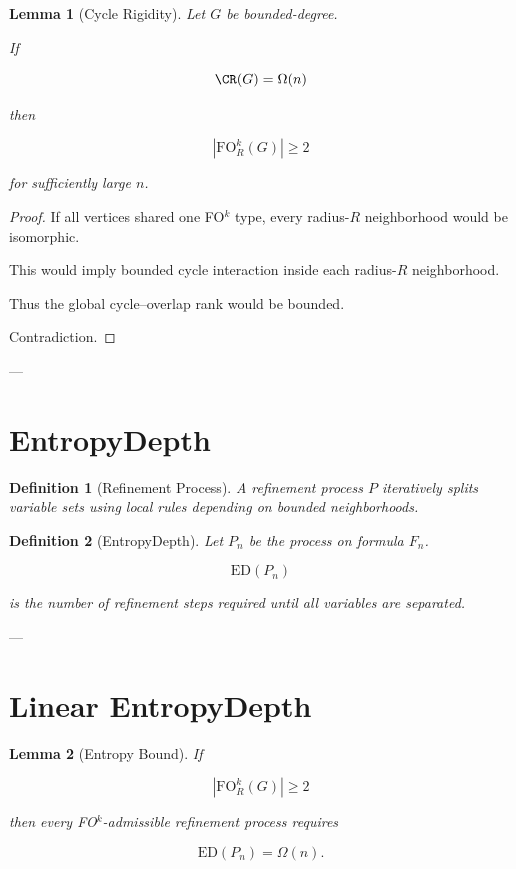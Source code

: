 \documentclass[11pt]{article}
\newtheorem{definition}{Definition}
\newtheorem{lemma}{Lemma}
\begin{document}
\begin{lemma}[Cycle Rigidity]
Let $G$ be bounded-degree.

If

\[
\CR(G) = \Omega(n)
\]

then

\[
|\mathrm{FO}^k_R(G)| \ge 2
\]

for sufficiently large $n$.
\end{lemma}

\begin{proof}
If all vertices shared one FO$^k$ type, every radius-$R$
neighborhood would be isomorphic.

This would imply bounded cycle interaction inside each
radius-$R$ neighborhood.

Thus the global cycle–overlap rank would be bounded.

Contradiction.
\end{proof}

---

\section{EntropyDepth}

\begin{definition}[Refinement Process]
A refinement process $P$ iteratively splits variable sets using
local rules depending on bounded neighborhoods.
\end{definition}

\begin{definition}[EntropyDepth]
Let $P_n$ be the process on formula $F_n$.

\[
\mathrm{ED}(P_n)
\]

is the number of refinement steps required until all variables
are separated.
\end{definition}

---

\section{Linear EntropyDepth}

\begin{lemma}[Entropy Bound]
If

\[
|\mathrm{FO}^k_R(G)| \ge 2
\]

then every FO$^k$-admissible refinement process requires

\[
\mathrm{ED}(P_n) = \Omega(n).
\]
\end{lemma}
\end{document}
